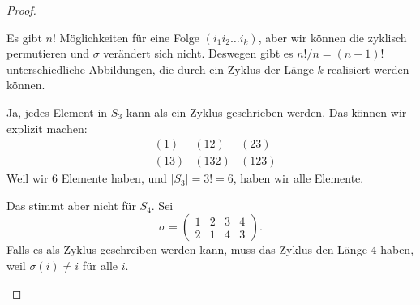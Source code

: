 \begin{proof}
	\begin{parts}
	\item Es gibt $n!$ Möglichkeiten f\"{u}r eine Folge $(i_1i_2\dots i_k)$, aber wir können die zyklisch permutieren und $\sigma$ verändert sich nicht. Deswegen gibt es $n! / n = (n-1)!$ unterschiedliche Abbildungen, die durch ein Zyklus der Länge $k$ realisiert werden können.

		Ja, jedes Element in $S_3$ kann als ein Zyklus geschrieben werden. Das können wir explizit machen:
		\begin{align*}
			& (1) & (12) & (23)\\
			& (13) & (132) & (123)
		\end{align*}
		Weil wir $6$ Elemente haben, und $|S_3|=3! = 6$, haben wir alle Elemente.

		Das stimmt aber nicht f\"{u}r $S_4$. Sei
		\[
			\sigma=\begin{pmatrix} 1 & 2 & 3 & 4\\ 2 & 1 & 4 & 3 \end{pmatrix} 
		.\] 
		Falls es als Zyklus geschreiben werden kann, muss das Zyklus den Länge $4$ haben, weil $\sigma(i)\neq i$ f\"{u}r alle $i$. 
	\end{parts}
\end{proof}
